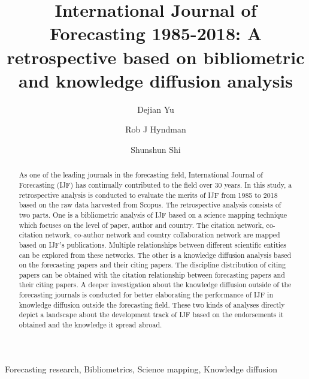 \documentclass[11pt,a4paper]{elsarticle} %
\begin{document}
\begin{frontmatter}

  \title{International Journal of Forecasting 1985-2018: A retrospective based on
bibliometric and knowledge diffusion analysis}
    \author[nau]{Dejian Yu}
  
    \author[monash]{Rob J Hyndman}
  
    \author[zufe]{Shunshun Shi}
      \address[nau]{Business School, Nanjing Audit University, Nanjing 211815, China}
    \address[monash]{Department of Econometrics \& Business Statistics, Clayton, VIC 3800,
Australia}
    \address[zufe]{Information School, Zhejiang University of Finance and Economics,
Hangzhou 310016, China}
  
  \begin{abstract}
  As one of the leading journals in the forecasting field, International
  Journal of Forecasting (IJF) has continually contributed to the field
  over 30 years. In this study, a retrospective analysis is conducted to
  evaluate the merits of IJF from 1985 to 2018 based on the raw data
  harvested from Scopus. The retrospective analysis consists of two parts.
  One is a bibliometric analysis of IJF based on a science mapping
  technique which focuses on the level of paper, author and country. The
  citation network, co-citation network, co-author network and country
  collaboration network are mapped based on IJF's publications. Multiple
  relationships between different scientific entities can be explored from
  these networks. The other is a knowledge diffusion analysis based on the
  forecasting papers and their citing papers. The discipline distribution
  of citing papers can be obtained with the citation relationship between
  forecasting papers and their citing papers. A deeper investigation about
  the knowledge diffusion outside of the forecasting journals is conducted
  for better elaborating the performance of IJF in knowledge diffusion
  outside the forecasting field. These two kinds of analyses directly
  depict a landscape about the development track of IJF based on the
  endorsements it obtained and the knowledge it spread abroad.
  \end{abstract}
   \begin{keyword} Forecasting research, Bibliometrics, Science mapping, Knowledge
diffusion\end{keyword}
 \end{frontmatter}
\end{document}
